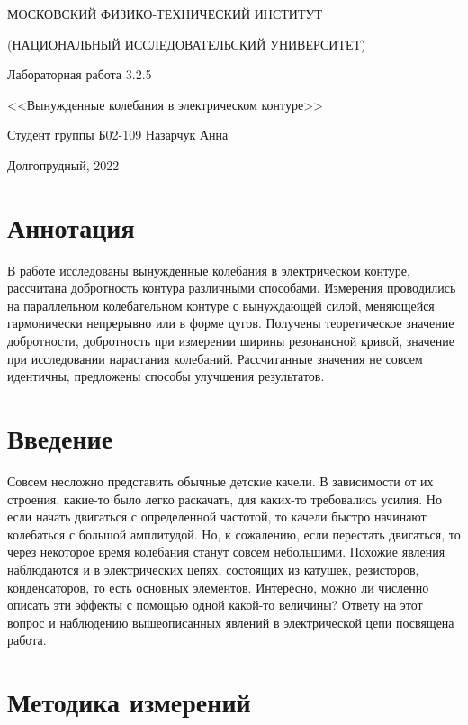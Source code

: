 \documentclass[a4paper,12pt]{article} %
\begin{document}
\begin{titlepage}

\thispagestyle{empty}

\centerline{МОСКОВСКИЙ ФИЗИКО-ТЕХНИЧЕСКИЙ ИНСТИТУТ}
\centerline{(НАЦИОНАЛЬНЫЙ ИССЛЕДОВАТЕЛЬСКИЙ УНИВЕРСИТЕТ)}

\vfill

\centerline{\huge{Лабораторная работа 3.2.5}}
\centerline{\LARGE{<<Вынужденные колебания в электрическом контуре>>}}

\vfill

Студент группы Б02-109 \hfill Назарчук Анна

\vfill

\centerline{Долгопрудный, 2022}
\clearpage
\end{titlepage} 

\section{Аннотация}
В работе исследованы вынужденные колебания в электрическом контуре, рассчитана добротность контура различными способами. Измерения проводились на параллельном колебательном контуре с вынуждающей силой, меняющейся гармонически непрерывно или в форме цугов. Получены теоретическое значение добротности, добротность при измерении ширины резонансной кривой, значение при исследовании нарастания колебаний. Рассчитанные значения не совсем идентичны, предложены способы улучшения результатов.

\section{Введение}
Совсем несложно представить обычные детские качели. В зависимости от их строения, какие-то было легко раскачать, для каких-то требовались усилия. Но если начать двигаться с определенной частотой, то качели быстро начинают колебаться с большой амплитудой. Но, к сожалению, если перестать двигаться, то через некоторое время колебания станут совсем небольшими. Похожие явления наблюдаются и в электрических цепях, состоящих из катушек, резисторов, конденсаторов, то есть основных элементов. Интересно, можно ли численно описать эти эффекты с помощью одной какой-то величины? Ответу на этот вопрос и наблюдению вышеописанных явлений в электрической цепи посвящена работа.

\section{Методика измерений}
\end{document}
